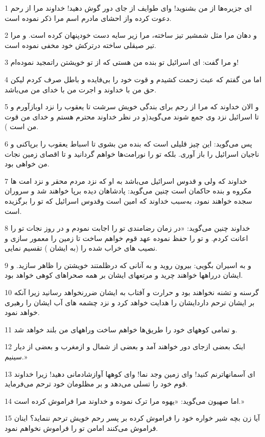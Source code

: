 \par 1 ای جزیره‌ها از من بشنوید! و‌ای طوایف از جای دور گوش دهید! خداوند مرا از رحم دعوت کرده واز احشای مادرم اسم مرا ذکر نموده است.
\par 2 و دهان مرا مثل شمشیر تیز ساخته، مرا زیر سایه دست خودپنهان کرده است. و مرا تیر صیقلی ساخته درترکش خود مخفی نموده است.
\par 3 و مرا گفت: ای اسرائیل تو بنده من هستی که از تو خویشتن راتمجید نموده‌ام!
\par 4 اما من گفتم که عبث زحمت کشیدم و قوت خود را بی‌فایده و باطل صرف کردم لیکن حق من با خداوند و اجرت من با خدای من می‌باشد.
\par 5 و الان خداوند که مرا از رحم برای بندگی خویش سرشت تا یعقوب را نزد اوبازآورم و تا اسرائیل نزد وی جمع شوند می‌گوید(و در نظر خداوند محترم هستم و خدای من قوت من است ).
\par 6 پس می‌گوید: این چیز قلیلی است که بنده من بشوی تا اسباط یعقوب را برپاکنی و ناجیان اسرائیل را باز آوری. بلکه تو را نورامت‌ها خواهم گردانید و تا اقصای زمین نجات من خواهی بود.
\par 7 خداوند که ولی و قدوس اسرائیل می‌باشد به او که نزد مردم محقر و نزد امت ها مکروه و بنده حاکمان است چنین می‌گوید: پادشاهان دیده برپا خواهند شد و سروران سجده خواهند نمود، به‌سبب خداوند که امین است وقدوس اسرائیل که تو را برگزیده است.
\par 8 خداوند چنین می‌گوید: «در زمان رضامندی تو را اجابت نمودم و در روز نجات تو را اعانت کردم. و تو را حفظ نموده عهد قوم خواهم ساخت تا زمین را معمور سازی و نصیب های خراب شده را (به ایشان ) تقسیم نمایی.
\par 9 و به اسیران بگویی: بیرون روید و به آنانی که درظلمتند خویشتن را ظاهر سازید. و ایشان درراهها خواهند چرید و مرتعهای ایشان بر همه صحراهای کوهی خواهد بود.
\par 10 گرسنه و تشنه نخواهند بود و حرارت و آفتاب به ایشان ضررنخواهد رسانید زیرا آنکه بر ایشان ترحم داردایشان را هدایت خواهد کرد و نزد چشمه های آب ایشان را رهبری خواهد نمود.
\par 11 و تمامی کوههای خود را طریق‌ها خواهم ساخت وراههای من بلند خواهد شد.
\par 12 اینک بعضی ازجای دور خواهند آمد و بعضی از شمال و ازمغرب و بعضی از دیار سینیم.»
\par 13 ‌ای آسمانهاترنم کنید! و‌ای زمین وجد نما! و‌ای کوهها آوازشادمانی دهید! زیرا خداوند قوم خود را تسلی می‌دهد و بر مظلومان خود ترحم می‌فرماید.
\par 14 اما صهیون می‌گوید: «یهوه مرا ترک نموده و خداوند مرا فراموش کرده است.»
\par 15 آیا زن بچه شیر خواره خود را فراموش کرده بر پسر رحم خویش ترحم ننماید؟ اینان فراموش می‌کنند امامن تو را فراموش نخواهم نمود.
